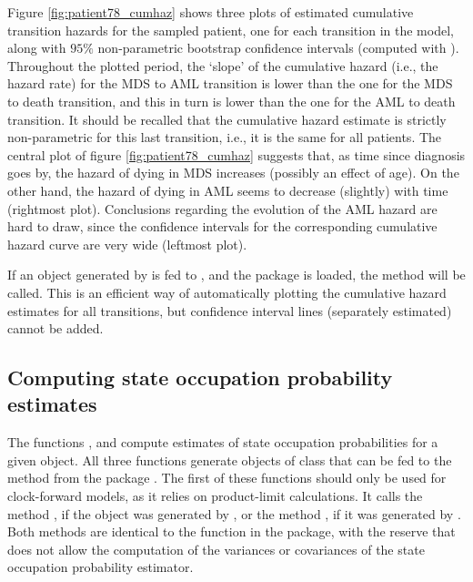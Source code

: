 Figure \ref{fig:patient78_cumhaz} shows three plots of estimated cumulative transition hazards for the sampled patient, one for each transition in the model, along with $95\%$ non-parametric bootstrap confidence intervals (computed with ). Throughout the plotted period, the `slope' of the cumulative hazard (i.e., the hazard rate) for the MDS to AML transition is lower than the one for the MDS to death transition, and this in turn is lower than the one for the AML to death transition. It should be recalled that the cumulative hazard estimate  is strictly non-parametric for this last transition, i.e., it is the same for all patients. The central plot of figure \ref{fig:patient78_cumhaz} suggests that, as time since diagnosis goes by, the hazard of dying in MDS increases (possibly an effect of age). On the other hand,  the hazard of dying in AML seems to decrease (slightly) with time (rightmost plot). Conclusions regarding the evolution of the AML hazard are hard to draw, since the confidence intervals for the corresponding cumulative hazard curve are very wide (leftmost plot). 

If an object generated by  is fed to ,  and the package  is loaded, the method  will be called. This is an efficient way of automatically plotting the cumulative hazard estimates for all transitions, but confidence interval lines (separately estimated) cannot be added.



\subsection{Computing state occupation probability estimates}
\label{sec:computing_transition_probs}
The functions ,  and  compute estimates of state occupation probabilities for a given  object.
All three functions generate objects of class  that can be fed to the   method from the package .
The first of these functions should only be used for clock-forward models, as it relies on product-limit calculations. It calls the method , if the  object was generated by , or the method , if it was generated by . Both methods are identical to the function  in the  package, with the reserve that   does not allow the computation of the variances or covariances of the state occupation probability estimator. 

